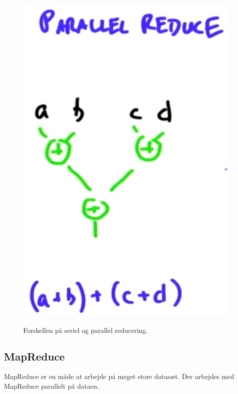 \begin{figure}[H]
\begin{minipage}{.49\textwidth}
		\label{seqReduce}
	\end{minipage}
	\begin{minipage}{.49\textwidth}
		\centering
		\includegraphics[height=\si]{figs/aggregation/paraReduce}
		\label{paraReduce}
	\end{minipage}
	\caption{Forskellen på seriel og parallel reducering.}
	\label{fig:reduce}
\end{figure}

\subsection{MapReduce}
MapReduce er en måde at arbejde på meget store datasæt. Der arbejdes med MapReduce parallelt på dataen.


